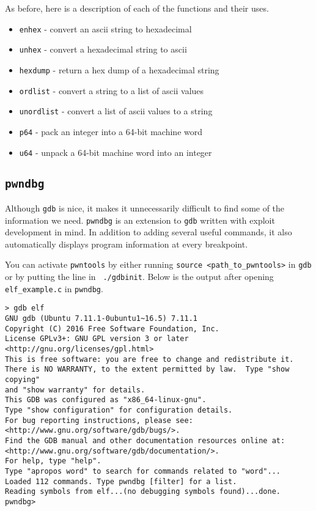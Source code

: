 As before, here is a description of each of the functions and their uses.
\begin{itemize}
    \item \texttt{enhex} - convert an ascii string to hexadecimal
    \item \texttt{unhex} - convert a hexadecimal string to ascii
    \item \texttt{hexdump} - return a hex dump of a hexadecimal string
    \item \texttt{ordlist} - convert a string to a list of ascii values
    \item \texttt{unordlist} - convert a list of ascii values to a string
    \item \texttt{p64} - pack an integer into a 64-bit machine word
    \item \texttt{u64} - unpack a 64-bit machine word into an integer
\end{itemize}

\subsection{\texttt{pwndbg}}
Although \texttt{gdb} is nice, it makes it unnecessarily difficult to find some
of the information we need. \texttt{pwndbg} is an extension to \texttt{gdb}
written with exploit development in mind. In addition to adding several useful
commands, it also automatically displays program information at every
breakpoint.

You can activate \texttt{pwntools} by either running \texttt{source
<path\_to\_pwntools>} in \texttt{gdb} or by putting the line in
\texttt{~./gdbinit}. Below is the output after opening \texttt{elf\_example.c} in
\texttt{pwndbg}.

\begin{lstlisting}
> gdb elf
GNU gdb (Ubuntu 7.11.1-0ubuntu1~16.5) 7.11.1
Copyright (C) 2016 Free Software Foundation, Inc.
License GPLv3+: GNU GPL version 3 or later <http://gnu.org/licenses/gpl.html>
This is free software: you are free to change and redistribute it.
There is NO WARRANTY, to the extent permitted by law.  Type "show copying"
and "show warranty" for details.
This GDB was configured as "x86_64-linux-gnu".
Type "show configuration" for configuration details.
For bug reporting instructions, please see:
<http://www.gnu.org/software/gdb/bugs/>.
Find the GDB manual and other documentation resources online at:
<http://www.gnu.org/software/gdb/documentation/>.
For help, type "help".
Type "apropos word" to search for commands related to "word"...
Loaded 112 commands. Type pwndbg [filter] for a list.
Reading symbols from elf...(no debugging symbols found)...done.
pwndbg> 
\end{lstlisting}

